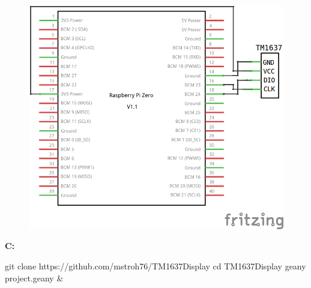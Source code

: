 \begin{figure}[ht]
	\centering
	\includegraphics[scale=0.25]{images/TM1637_Schaltplan.png}	
	\label{TM1637}
\end{figure}


\textbf{C:} 

\begin{console}
git clone https://github.com/mstroh76/TM1637Display
cd TM1637Display
geany project.geany & 
\end{console}

